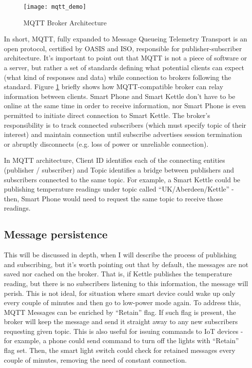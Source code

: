\begin{figure}[ht]
    \centering
    \texttt{[image: mqtt\_demo]}
    \caption{MQTT Broker Architecture}
    \label{fig:mqtt}
\end{figure}

In short, MQTT, fully expanded to Message Queueing Telemetry Transport is an open protocol, certified by OASIS and ISO\cite{banks2019mqtt}, responsible for publisher-subscriber architecture. It's important to point out that MQTT is not a piece of software or a server, but rather a set of standards defining what potential clients can expect (what kind of responses and data) while connection to brokers following the standard. Figure \ref{fig:mqtt} briefly shows how MQTT-compatible broker can relay information between clients. Smart Phone and Smart Kettle don't have to be online at the same time in order to receive information, nor Smart Phone is even permitted to initiate direct connection to Smart Kettle. The broker's responsibility is to track connected subscribers (which must specify topic of their interest) and maintain connection until subscribe advertises session termination or abruptly disconnects (e.g. loss of power or unreliable connection).

In MQTT architecture, Client ID identifies each of the connecting entities (publisher / subscriber) and Topic identifies a bridge between publishers and subscribers connected to the same topic. For example, a Smart Kettle could be publishing temperature readings under topic called ``UK/Aberdeen/Kettle'' - then, Smart Phone would need to request the same topic to receive those readings. 

\subsection{Message persistence}
This will be discussed in depth, when I will describe the process of publishing and subscribing, but it's worth pointing out that by default, the messages are not saved nor cached on the broker. That is, if Kettle publishes the temperature reading, but there is no subscribers listening to this information, the message will perish. This is not ideal, for situation where smart device could wake up only every couple of minutes and then go to low-power mode again. To address this, MQTT Messages can be enriched by ``Retain'' flag. If such flag is present, the broker will keep the message and send it straight away to any new subscribers requesting given topic. This is also useful for issuing commands to IoT devices - for example, a phone could send command to turn off the lights with ``Retain'' flag set. Then, the smart light switch could check for retained messages every couple of minutes, removing the need of constant connection.

